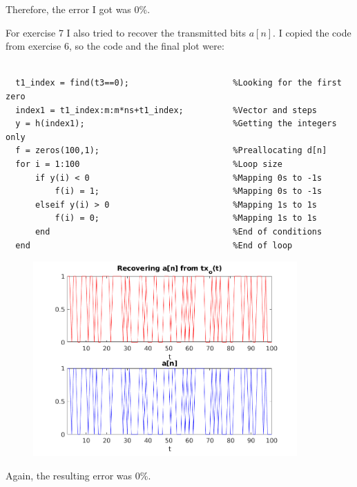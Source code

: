 \documentclass[a4paper,11pt]{article}
\begin{document}
Therefore, the error I got was 0\%.

\newpage

For exercise 7 I also tried to recover the transmitted bits $a[n]$. I copied
the code from exercise 6, so the code and the final plot were:

\bigskip

\begin{lstlisting}

  t1_index = find(t3==0);                     %Looking for the first zero
  index1 = t1_index:m:m*ns+t1_index;          %Vector and steps
  y = h(index1);                              %Getting the integers only
  f = zeros(100,1);                           %Preallocating d[n]
  for i = 1:100                               %Loop size
      if y(i) < 0                             %Mapping 0s to -1s
          f(i) = 1;                           %Mapping 0s to -1s
      elseif y(i) > 0                         %Mapping 1s to 1s
          f(i) = 0;                           %Mapping 1s to 1s
      end                                     %End of conditions
  end                                         %End of loop

\end{lstlisting}

\bigskip

\begin{figure}[!hp]
    \begin{center}
      \includegraphics[width=0.9\textwidth]{images/exercise7.png}
    \end{center}
\end{figure}

Again, the resulting error was 0\%.
\end{document}
